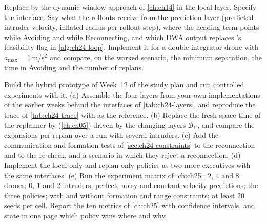 \begin{exercise}[\difficulty{2}]
\label{exr:ch24-dwa}
Replace \orca by the dynamic window approach of \cref{ch:ch14} in the local
layer. Specify the interface. Say what the rollouts receive from the
prediction layer (predicted intruder velocity, inflated radius per rollout
step), where the heading term points while Avoiding and while Reconnecting,
and which DWA output replaces \orca's feasibility flag in \cref{alg:ch24-loop}.
Implement it for a double-integrator drone with $a_{\max} = 1$\,m/s$^2$ and
compare, on the worked scenario, the minimum separation, the time in
Avoiding and the number of replans.
\end{exercise}

\begin{exercise}
\label{exr:ch24-coding}
Build the hybrid prototype of Week~12 of the study plan and run controlled
experiments with it. (a) Assemble the four layers from your own
implementations of the earlier weeks behind the interfaces of
\cref{tab:ch24-layers}, and reproduce the trace of \cref{tab:ch24-trace}
with  as the reference. (b) Replace the fresh
space-time \astar of the replanner by \dstarlite (\cref{ch:ch05}) driven by
the changing layers $\mathcal{B}_{t'}$, and compare the expansions per replan
over a run with several intruders. (c) Add the communication and formation
tests of \cref{sec:ch24-constraints} to the reconnection and to the re-check,
and a scenario in which they reject a reconnection. (d) Implement the
local-only and replan-only policies as two more executives with the same
interfaces. (e) Run the experiment matrix of \cref{ch:ch25}: $2$, $4$ and
$8$ drones; $0$, $1$ and $2$ intruders; perfect, noisy and constant-velocity
predictions; the three policies; with and without formation and range
constraints; at least $20$ seeds per cell. Report the ten metrics of
\cref{ch:ch25} with confidence intervals, and state in one page which policy
wins where and why.
\end{exercise}
